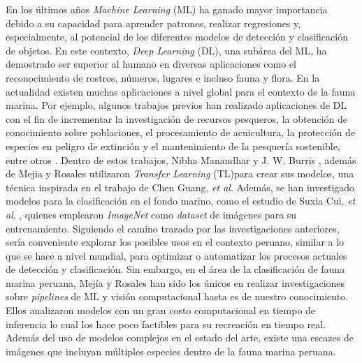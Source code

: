
En los últimos años \textit{Machine Learning} (ML) ha ganado  
mayor importancia debido a su capacidad para aprender patrones, 
realizar regresiones y, especialmente, al potencial de los diferentes 
modelos de detección y clasificación de objetos. En este contexto, \textit{Deep Learning} (DL), 
una subárea del ML, ha demostrado ser superior al humano en diversas 
aplicaciones como el reconocimiento de rostros, números, lugares e incluso fauna y flora.
\newline
\newline
En la actualidad existen muchas aplicaciones a nivel global para el contexto de 
la fauna marina. Por ejemplo, algunos trabajos previos han realizado aplicaciones de DL 
con el fin de incrementar la investigación de recursos pesqueros, la obtención 
de conocimiento sobre poblaciones, el procesamiento de acuicultura, la protección de 
especies en peligro de extinción y el mantenimiento de la pesquería 
sostenible, entre otros 
\cite{10.1145/3419635.3419643, 10.1145/3325917.3325934,20.500.12724/11174,8371919}.
\newline
\newline
Dentro de estos trabajos, Nibha Manandhar y J. W. Burris , además de 
Mejia y Rosales utilizaron \textit{Transfer Learning} (TL)para crear sus modelos, 
una técnica inspirada en el trabajo de Chen Guang, 
\textit{et al}. Además, se han investigado modelos para la 
clasificación en el fondo marino, como el estudio de Suxia Cui, 
\textit{et al}. \cite{Cui2020}, quienes emplearon \textit{ImageNet} \cite{ImageNet} como 
\textit{dataset} de imágenes para su entrenamiento. 
\newline
\newline
Siguiendo el camino trazado por las investigaciones anteriores, sería conveniente explorar 
los posibles usos en el contexto peruano, similar a lo que se hace a nivel 
mundial, para optimizar o automatizar los procesos actuales de detección y 
clasificación. Sin embargo, en el área de la clasificación de fauna marina 
peruana, Mejía y Rosales han sido los únicos en 
realizar investigaciones sobre \textit{pipelines} de ML y visión 
computacional hasta es de nuestro conocimiento. Ellos analizaron modelos con 
un gran costo computacional en tiempo de inferencia lo cual los hace poco 
factibles para su recreación en tiempo real. 
\newline
\newline
Además del uso de modelos complejos en el estado del arte, existe una escazes 
de imágenes que incluyan múltiples especies dentro de la fauna marina peruana. 

